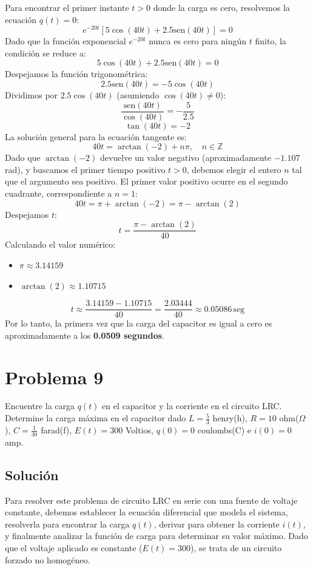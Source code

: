 \documentclass[a4paper]{article}
\begin{document}
Para encontrar el primer instante $t > 0$ donde la carga es cero, resolvemos la ecuación $q(t) = 0$:
$$
e^{-20t} [5 \cos(40t) + 2.5 \text{sen}(40t)] = 0
$$
Dado que la función exponencial $e^{-20t}$ nunca es cero para ningún $t$ finito, la condición se reduce a:
$$
5 \cos(40t) + 2.5 \text{sen}(40t) = 0
$$
Despejamos la función trigonométrica:
$$
2.5 \text{sen}(40t) = -5 \cos(40t)
$$
Dividimos por $2.5 \cos(40t)$ (asumiendo $\cos(40t) \neq 0$):
$$
\frac{\text{sen}(40t)}{\cos(40t)} = -\frac{5}{2.5}
$$
$$
\tan(40t) = -2
$$
La solución general para la ecuación tangente es:
$$
40t = \arctan(-2) + n\pi, \quad n \in \mathbb{Z}
$$
Dado que $\arctan(-2)$ devuelve un valor negativo (aproximadamente $-1.107$ rad), y buscamos el primer tiempo positivo $t > 0$, debemos elegir el entero $n$ tal que el argumento sea positivo. El primer valor positivo ocurre en el segundo cuadrante, correspondiente a $n=1$:
$$
40t = \pi + \arctan(-2) = \pi - \arctan(2)
$$
Despejamos $t$:
$$
t = \frac{\pi - \arctan(2)}{40}
$$
Calculando el valor numérico:
\begin{itemize}
    \item $\pi \approx 3.14159$
    \item $\arctan(2) \approx 1.10715$
\end{itemize}
$$
t \approx \frac{3.14159 - 1.10715}{40} = \frac{2.03444}{40} \approx 0.05086 \, \text{seg}
$$
Por lo tanto, la primera vez que la carga del capacitor es igual a cero es aproximadamente a los \textbf{0.0509 segundos}.


\section{Problema 9}
Encuentre la carga $q(t)$ en el capacitor y la corriente en el circuito LRC. Determine la carga máxima en el capacitor dado $L= \frac{5}{3}$ henry(h), $R= 10$ ohm($\Omega$), $C= \frac{1}{30}$ farad(f), $E(t)= 300$ Voltios, $q(0)= 0$ coulombs(C) e $i(0)= 0$ amp.

\subsection{Solución}
Para resolver este problema de circuito LRC en serie con una fuente de voltaje constante, debemos establecer la ecuación diferencial que modela el sistema, resolverla para encontrar la carga $q(t)$, derivar para obtener la corriente $i(t)$, y finalmente analizar la función de carga para determinar su valor máximo. Dado que el voltaje aplicado es constante ($E(t) = 300$), se trata de un circuito forzado no homogéneo.
\end{document}
